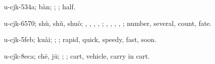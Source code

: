 \begin{multicols}{2}
{\cjkgGlue{}u-cjk-534a; bàn; \cjkgGlue{}\cjkgGlue{}\cjkgGlue{}; \cjkgGlue{}; half.

\cjkgGlue{}u-cjk-6570; shù, shǔ, shuò; \cjkgGlue{}, \cjkgGlue{}\cjkgGlue{}\cjkgGlue{}, \cjkgGlue{}, \cjkgGlue{}\cjkgGlue{}\cjkgGlue{}, \cjkgGlue{}\cjkgGlue{}\cjkgGlue{}; \cjkgGlue{}, \cjkgGlue{}, \cjkgGlue{}, \cjkgGlue{}, \cjkgGlue{}; number, several, count, fate.

\cjkgGlue{}u-cjk-5feb; kuài; \cjkgGlue{}\cjkgGlue{}\cjkgGlue{}; \cjkgGlue{}; rapid, quick, speedy, fast, soon.

\cjkgGlue{}u-cjk-8eca; chē, jū; \cjkgGlue{}; \cjkgGlue{}; cart, vehicle, carry in cart.

}
\end{multicols}
